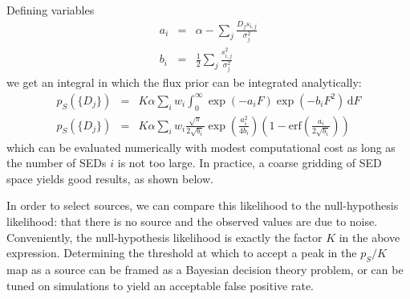 \documentclass[letterpaper,preprint]{aastex62}
\newcommand{\dd}{\mathrm{d}}
\newcommand{\erf}{\textrm{erf}}
\begin{document}
Defining variables
\begin{eqnarray}
  a_i &=& \alpha - \sum_j \frac{D_j s_{i,j}}{\sigma_j^2} \\
  b_i &=& \frac{1}{2} \sum_j \frac{s_{i,j}^2}{\sigma_j^2}
\end{eqnarray}
we get an integral in which the flux prior can be integrated analytically:
%
\begin{eqnarray}
  p_S(\{ D_j \})
  &=&
  K \alpha
  \sum_i w_i 
  \int_0^{\infty}
    \exp(-a_i F) \exp(-b_i F^2)
    \, \dd F
    \\
  p_S(\{ D_j \})
  &=&
  K \alpha
  \sum_i w_i 
  \frac{\sqrt{\pi}}{2 \sqrt{b_i}}
  \exp \left(\frac{a_i^2}{4 b_i} \right)
  \left(1 - \erf\left( \frac{a_i}{2 \sqrt{b_i}} \right) \right)
  \label{eq:pfg}
\end{eqnarray}
which can be evaluated numerically with modest computational cost as
long as the number of SEDs $i$ is not too large.  In practice, a
coarse gridding of SED space yields good results, as shown below.



In order to select sources, we can compare this likelihood to the
null-hypothesis likelihood: that there is no source and the observed
values are due to noise.  Conveniently, the null-hypothesis likelihood
is exactly the factor $K$ in the above expression.  Determining the
threshold at which to accept a peak in the $p_S/K$ map as a source can
be framed as a Bayesian decision theory problem, or can be tuned on
simulations to yield an acceptable false positive rate.

\end{document}
